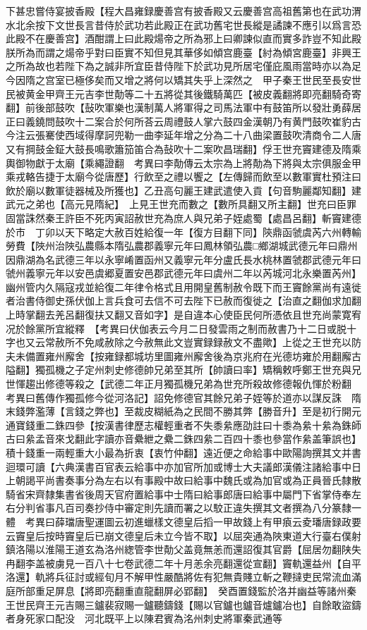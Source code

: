 下甚忠嘗侍宴披香殿【程大昌雍録慶善宫有披香殿又云慶善宫高祖舊第也在武功渭水北余按下文世長言昔侍於武功若此殿正在武功舊宅世長縱是譎諫不應引以爲言恐此殿不在慶善宫】酒酣謂上曰此殿煬帝之所為邪上曰卿諫似直而實多詐豈不知此殿朕所為而謂之煬帝乎對曰臣實不知但見其華侈如傾宫鹿臺【紂為傾宮鹿臺】非興王之所為故也若陛下為之誠非所宜臣昔侍陛下於武功見所居宅僅庇風雨當時亦以為足今因隋之宫室已極侈矣而又增之將何以矯其失乎上深然之　甲子秦王世民至長安世民被黄金甲齊王元吉李世勣等二十五將從其後鐵騎萬匹【被皮義翻將即亮翻騎奇寄翻】前後部鼓吹【鼔吹軍樂也漢制萬人將軍得之司馬法軍中有鼓笛所以發壯勇薛居正曰義鐃問鼓吹十二案合於何所荅云周禮鼓人掌六鼓四金漢朝乃有黄門鼓吹崔豹古今注云張騫使西域得摩訶兜勒一曲李延年增之分為二十八曲梁置鼓吹清商令二人唐又有掆鼓金鉦大鼓長鳴歌簫笳笛合為鼔吹十二案吹昌瑞翻】俘王世充竇建德及隋乘輿御物獻于太廟【乘繩證翻　考異曰李勣傳云太宗為上將勣為下將與太宗俱服金甲乘戎輅告捷于太廟今從唐歷】行飲至之禮以饗之【左傳歸而飲至以數軍實杜預注曰飲於廟以數軍徒器械及所獲也】乙丑高句麗王建武遣使入貢【句音駒麗鄰知翻】建武元之弟也【高元見隋紀】　上見王世充而數之【數所具翻又所主翻】世充曰臣罪固當誅然秦王許臣不死丙寅詔赦世充為庶人與兄弟子姪處蜀【處昌呂翻】斬竇建德於市　丁卯以天下略定大赦百姓給復一年【復方目翻下同】陝鼎函虢虞芮六州轉輸勞費【陜州治陜弘農縣本隋弘農郡義寧元年曰鳳林領弘農□鄉湖城武德元年曰鼎州因鼎湖為名武德三年以永寧崤置函州又義寧元年分盧氏長水桃林置虢郡武德元年曰虢州義寧元年以安邑虞郷夏置安邑郡武德元年曰虞州二年以芮城河北永樂置芮州】幽州管内久隔寇戎並給復二年律令格式且用開皇舊制赦令既下而王竇餘黨尚有遠徙者治書侍御史孫伏伽上言兵食可去信不可去陛下已赦而復徙之【治直之翻伽求加翻上時掌翻去羌呂翻復扶又翻又音如字】是自違本心使臣民何所憑依且世充尚蒙寛宥况於餘黨所宜縱釋　【考異曰伏伽表云今月二日發雲雨之制而赦書乃十二日或脱十字也又云常赦所不免咸赦除之今赦無此文豈實録録赦文不盡歟】上從之王世充以防夫未備置雍州廨舍【按雍録都城坊里圖雍州廨舍後為京兆府在光德坊雍於用翻廨古隘翻】獨孤機之子定州刺史修德帥兄弟至其所【帥讀曰率】矯稱敕呼鄭王世充與兄世惲趨出修德等殺之【武德二年正月獨孤機兄弟為世充所殺故修德報仇惲於粉翻　考異曰舊傳作獨孤修今從河洛記】詔免修德官其餘兄弟子姪等於道亦以謀反誅　隋末錢弊濫薄【言錢之弊也】至裁皮糊紙為之民間不勝其弊【勝音升】至是初行開元通寶錢重二銖四參【按漢書律歷志權輕重者不失黍絫應劭註曰十黍為絫十絫為銖師古曰絫孟音來戈翻此字讀亦音纍紲之纍二銖四絫二百四十黍也參當作絫盖筆誤也】積十錢重一兩輕重大小最為折衷【衷竹仲翻】遠近便之命給事中歐陽詢撰其文并書迴環可讀【六典漢書百官表云給事中亦加官所加或博士大夫議郎漢儀注諸給事中日上朝謁平尚書奏事分為左右以有事殿中故曰給事中魏氏或為加官或為正員晉氏隸散騎省宋齊隸集書省後周天官府置給事中士隋曰給事郎唐曰給事中屬門下省掌侍奉左右分判省事凡百司奏抄侍中審定則先讀而署之以駮正違失撰其文者撰為八分篆隸一體　考異曰薛璫唐聖運圖云初進蠟樣文德皇后搯一甲故錢上有甲㾗云夌璠唐録政要云竇皇后按時竇皇后已崩文德皇后未立今皆不取】以屈突通為陜東道大行臺右僕射鎮洛陽以淮陽王道玄為洛州緫管李世勣父盖竟無恙而還詔復其官爵【屈居勿翻陕失冉翻李盖被虜見一百八十七卷武德二年十月恙余亮翻還從宣翻】竇軌還益州【自平洛還】軌將兵征討或經旬月不解甲性嚴酷將佐有犯無貴賤立斬之鞭撻吏民常流血滿庭所部重足屏息【將即亮翻重直龍翻屏必郢翻】　癸酉置錢監於洛并幽益等諸州秦王世民齊王元吉賜三鑪裴寂賜一鑪聽鑄錢【賜以官鑪也鑪音爐鑪冶也】自餘敢盜鑄者身死家口配没　河北既平上以陳君賓為洺州刺史將軍秦武通等